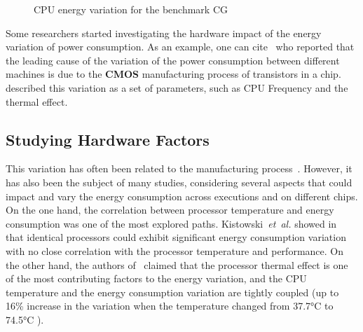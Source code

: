 \begin{figure}%
    \caption{CPU energy variation for the benchmark \textsf{CG}}\label{fig:motivation}
\end{figure}
Some researchers started investigating the hardware impact of the energy variation of power consumption.
As an example, one can cite~\cite{borkar_designing_2005,tschanz_adaptive_2002} who reported that the leading cause of the variation of the power consumption between different machines is due to the \textbf{CMOS} manufacturing process of transistors in a chip.
\cite{heinrich_predicting} described this variation as a set of parameters, such as CPU Frequency and the thermal effect.
\subsection{Studying Hardware Factors}
This variation has often been related to the manufacturing process~\cite{coles_comparing_2014}. However, it has also been the subject of many studies, considering several aspects that could impact and vary the energy consumption across executions and on different chips.
On the one hand, the correlation between processor temperature and energy consumption was one of the most explored paths.
Kistowski~\emph{et~al.} showed in~\cite{joakim_v_kisroski_variations_2016} that identical processors could exhibit significant energy consumption variation with no close correlation with the processor temperature and performance.
On the other hand, the authors of~\cite{wang_potential_2018} claimed that the processor thermal effect is one of the most contributing factors to the energy variation, and the CPU temperature and the energy consumption variation are tightly coupled (up to 16\% increase in the variation when the temperature changed from 37.7°C to 74.5°C ).

